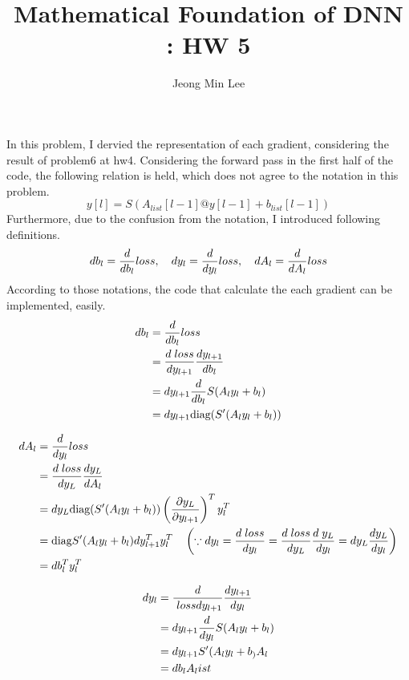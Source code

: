 \documentclass[10pt]{article}
\title{\textbf{Mathematical Foundation of DNN : HW 5}}
\author{Jeong Min Lee}
\begin{document}
\maketitle

\section{}
In this problem, I dervied the representation of each gradient, considering the result of problem6 at hw4.
Considering the forward pass in the first half of the code, the following relation is held, which does not agree to the notation in this problem.
\begin{equation*}
    y[l] = S(A_{list}[l-1]@y[l-1] + b_{list}[l-1])
\end{equation*}
Furthermore, due to the confusion from the notation, I introduced following definitions.
\begin{equation*}
    db_l = {d\over db_l}loss, \quad dy_l = {d\over dy_l}loss, \quad  dA_l = {d\over dA_l}loss
\end{equation*}
According to those notations, the code that calculate the each gradient can be implemented, easily.
\begin{align*}
    db_l &= {d\over db_l}loss \\
    &= {d\;loss\over dy_{l+1}} {d y_{l+1}\over db_l} \\
    &= dy_{l+1}{d \over db_l} S(A_ly_l + b_l)\\
    &= dy_{l+1}\text{diag}(S^\prime(A_ly_l + b_l))
\end{align*}

\begin{align*}
    dA_l &= {d\over dy_l}loss \\
    &= {d\; loss \over dy_L}{dy_L\over dA_l} \\
    &= dy_L \text{diag}(S^\prime(A_ly_l+b_l)) \left(\partial y_L\over \partial y_{l+1}\right)^T y_l^T \\
    &= \text{diag}S^\prime(A_ly_l+b_l)dy_{l+1}^Ty_l^T\quad \left(\because dy_l = {d\; loss \over dy_l} = {d \; loss \over dy_L}{d\; y_L\over dy_l} = dy_L{d y_L \over dy_l} \right) \\
    &= db_l^Ty_l^T
\end{align*}

\begin{align*}
    dy_l &= {d\over \; loss dy_{l+1}}{dy_{l+1}\over dy_l} \\
    &= dy_{l+1} {d\over dy_l} S(A_ly_l + b_l) \\
    &= dy_{l+1}S^\prime(A_ly_l+b_)A_l \\
    &= db_lA_list
\end{align*}
\end{document}
